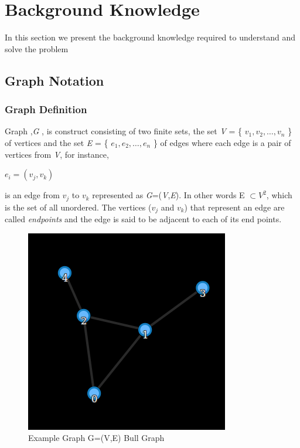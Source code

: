 \section{Background Knowledge}
In this section we present the background knowledge required to understand and solve the problem
\subsection{Graph Notation}

\subsubsection{Graph Definition}
Graph ,\textit{G} , is construct consisting of two finite sets, the set \textit{V} = \{ $v_1,v_2, \ldots ,v_n$ \} of vertices and the set \textit{E} = \{ $e_1,e_2, \ldots,e_n$  \} of edges where each edge is a pair of vertices from \textit{V}, for instance,
\begin{center}
$e_i = (v_j,v_k)$
\end{center}
is an edge from $v_j$ to $v_k$ represented as \textit{G}=(\textit{V},\textit{E}). In other words  E $\subset V^2$, which is the set of all unordered. The vertices ($v_j$ and $v_k$) that represent an edge are called \textit{endpoints} and the edge is said to be adjacent to each of its end points. 



\begin{figure}[h]
\caption{Example Graph G=(V,E) Bull Graph}
\includegraphics[scale=0.5]{bull.png}
\centering

\end{figure}


